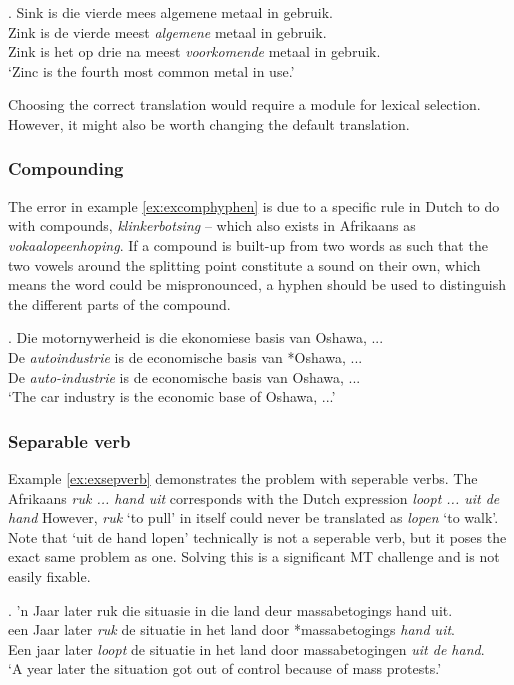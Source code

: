 \documentclass[11pt]{article}
\begin{document}
\ex. \label{ex:expolysem} 
    Sink is die vierde mees algemene metaal in gebruik. \\
    Zink is de vierde meest {\em algemene} metaal in gebruik. \\
    Zink is het op drie na meest {\em voorkomende} metaal in gebruik. \\
    `Zinc is the fourth most common metal in use.' 

Choosing the correct translation would require a module for lexical selection. However, it might also
be worth changing the default translation.

\subsubsection{Compounding}
The error in example \ref{ex:excomphyphen} is due to a specific rule in Dutch to do with 
compounds, \emph{klinkerbotsing} -- which also exists in Afrikaans 
as \emph{vokaalopeenhoping}. If a compound is built-up from two words as such 
that the two vowels around the splitting point constitute a sound on their own, 
which means the word could be mispronounced, a hyphen should be used to distinguish 
the different parts of the compound. 

\ex. \label{ex:excomphyphen} 
    Die motornywerheid is die ekonomiese basis van Oshawa, ...  \\
    De {\em autoindustrie} is de economische basis van *Oshawa, ... \\
    De {\em auto-industrie} is de economische basis van Oshawa, ... \\
   `The car industry is the economic base of Oshawa, ...'


\subsubsection{Separable verb}

Example \ref{ex:exsepverb} demonstrates the problem with seperable verbs. The 
Afrikaans \emph{ruk ... hand uit} corresponds with the Dutch expression
\emph{loopt ... uit de hand} However, \emph{ruk} `to pull' in itself 
could never be translated as \emph{lopen} `to walk'. Note that `uit de hand lopen' 
 technically is not a seperable verb, but it poses the exact same problem as one.
Solving this is a significant MT challenge and is not easily fixable.  

\ex. \label{ex:exsepverb} 
    'n Jaar later ruk die situasie in die land deur massabetogings hand uit. \\
    een Jaar later {\em *ruk} de situatie in het land door *massabetogings {\em hand uit}. \\
    Een jaar later {\em loopt} de situatie in het land door massabetogingen {\em uit de hand}. \\
    `A year later the situation got out of control because of mass protests.'
\end{document}
